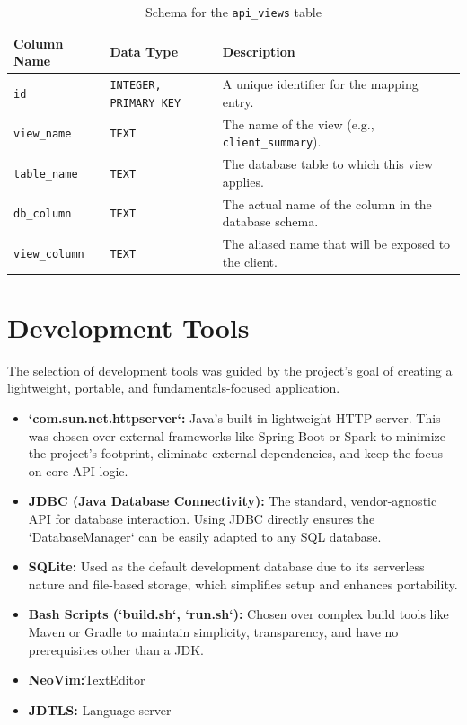 \documentclass[12pt, a4paper]{report}
\begin{document}
\begin{table}[h!]
    \centering
    \caption{Schema for the \lstinline|api_views| table}
    \label{tab:api_views}
    \begin{tabularx}{\textwidth}{@{} l l X @{}}
        \toprule
        \textbf{Column Name} & \textbf{Data Type} & \textbf{Description} \\
        \midrule
        \lstinline|id| & \texttt{INTEGER, PRIMARY KEY} & A unique identifier for the mapping entry. \\
        \lstinline|view_name| & \texttt{TEXT} & The name of the view (e.g., \lstinline|client_summary|). \\
        \lstinline|table_name| & \texttt{TEXT} & The database table to which this view applies. \\
        \lstinline|db_column| & \texttt{TEXT} & The actual name of the column in the database schema. \\
        \lstinline|view_column| & \texttt{TEXT} & The aliased name that will be exposed to the client. \\
        \bottomrule
    \end{tabularx}
\end{table}

\section{Development Tools}
The selection of development tools was guided by the project's goal of creating a lightweight, portable, and fundamentals-focused application.
\begin{itemize}
    \item \textbf{`com.sun.net.httpserver`:} Java's built-in lightweight HTTP server. This was chosen over external frameworks like Spring Boot or Spark to minimize the project's footprint, eliminate external dependencies, and keep the focus on core API logic.
    \item \textbf{JDBC (Java Database Connectivity):} The standard, vendor-agnostic API for database interaction. Using JDBC directly ensures the `DatabaseManager` can be easily adapted to any SQL database.
    \item \textbf{SQLite:} Used as the default development database due to its serverless nature and file-based storage, which simplifies setup and enhances portability.
    \item \textbf{Bash Scripts (`build.sh`, `run.sh`):} Chosen over complex build tools like Maven or Gradle to maintain simplicity, transparency, and have no prerequisites other than a JDK.
    \item \textbf{NeoVim:}TextEditor 
    \item \textbf{JDTLS:} Language server
\end{itemize}
\end{document}
